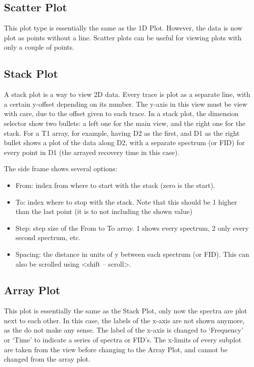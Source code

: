\documentclass[11pt,a4paper]{article}
\begin{document}
\subsection{Scatter Plot}
This plot type is essentially the same as the 1D Plot. However, the data is now plot as points without a line. Scatter plots can be useful for viewing 
plots with only a couple of points.

\subsection{Stack Plot}
A stack plot is a way to view 2D data. Every trace is plot as a separate line, with a certain y-offset depending on its number. The y-axis in this view must be view with care,
due to the offset given to each trace. In a stack plot, the dimension selector show two bullets: a left one for the main view, and the right one for the stack. For a T1 array, for example, having D2 as the first, and D1 
as the right bullet shows a plot of the data along D2, with a separate spectrum (or FID) for every point in D1 (the arrayed recovery time in this case).

The side frame shows several options:
\begin{itemize}
  \item From: index from where to start with the stack (zero is the start).
  \item To: index where to stop with the stack. Note that this should be 1 higher than the last point (it is to not including the shown value)
  \item Step: step size of the From to To array. 1 shows every spectrum, 2 only every second spectrum, etc.
  \item Spacing: the distance in units of y between each spectrum (or FID). This can also be scrolled using <shift -- scroll>.
\end{itemize}

\subsection{Array Plot}
This plot is essentially the same as the Stack Plot, only now the spectra are plot next to each other. In this case, the labels of the x-axis are
not shown anymore, as the do not make any sense. The label of the x-axis is changed to `Frequency' or `Time' to indicate a series of spectra or FID's.
The x-limits of every subplot are taken from the view before changing to the Array Plot, and cannot be changed from the array plot.
\end{document}
